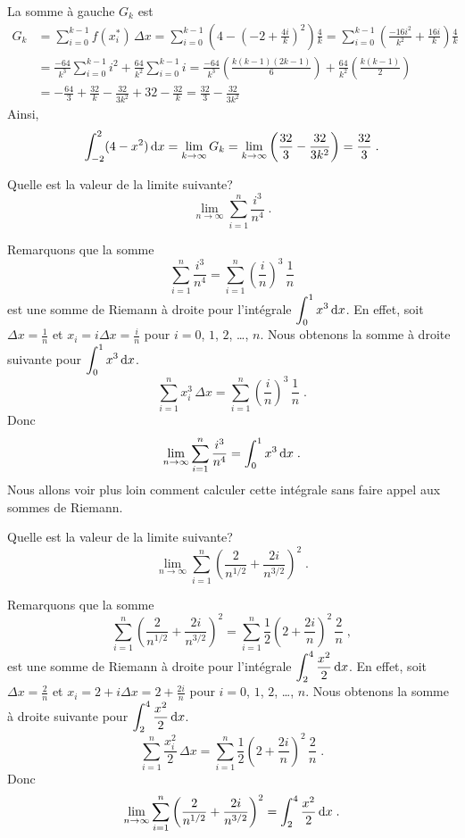 {\begin{egg}
La somme à gauche $G_k$ est
\begin{align*}
G_k &= \sum_{i=0}^{k-1} f(x_i^\ast) \, \Delta x 
= \sum_{i=0}^{k-1} \left(4-\left(-2+\frac{4i}{k}\right)^2\right) \frac{4}{k}
= \sum_{i=0}^{k-1} \left(\frac{-16i^2}{k^2}  + \frac{16i}{k}\right)
\frac{4}{k} \\
&= \frac{-64}{k^3} \sum_{i=0}^{k-1} i^2 + \frac{64}{k^2} \sum_{i=0}^{k-1} i
= \frac{-64}{k^3} \left(\frac{k(k-1)(2k-1)}{6} \right)
+ \frac{64}{k^2} \left(\frac{k(k-1)}{2} \right) \\
&= -\frac{64}{3} + \frac{32}{k} - \frac{32}{3k^2}
+ 32 - \frac{32}{k}  = \frac{32}{3} - \frac{32}{3k^2}
\end{align*}
Ainsi,
\[
\int_{-2}^2 (4-x^2)\,\mathrm{d}x = \lim_{k\rightarrow \infty} G_k
= \lim_{k\rightarrow \infty}
\left(\frac{32}{3} - \frac{32}{3k^2}\right) =
\frac{32}{3} \; .
\]
\end{egg}

\begin{egg}
Quelle est la valeur de la limite suivante?
\[
\lim_{n\rightarrow \infty} \sum_{i=1}^n \frac{i^3}{n^4} \; .
\]

Remarquons que la somme
\[
\sum_{i=1}^n \frac{i^3}{n^4} = \sum_{i=1}^n \left(\frac{i}{n}\right)^3
\, \frac{1}{n}
\]
est une somme de Riemann à droite pour l'intégrale
$\displaystyle \int_0^1 x^3 \,\mathrm{d}x$.
En effet, soit $\displaystyle \Delta x = \frac{1}{n}$ et
$\displaystyle x_i = i \Delta x = \frac{i}{n}$ pour $i=0$, $1$, $2$,
\ldots, $n$.  Nous obtenons la somme à droite suivante pour
$\displaystyle \int_0^1 x^3 \,\mathrm{d}x$.
\[
\sum_{i=1}^n x_i^3 \, \Delta x
= \sum_{i=1}^n \left(\frac{i}{n}\right)^3 \, \frac{1}{n} \; .
\]
Donc
\[
\lim_{n\rightarrow \infty} \sum_{i=1}^n \frac{i^3}{n^4}
= \int_0^1 x^3 \,\mathrm{d}x \; .
\]
Nous allons voir plus loin comment calculer cette intégrale sans faire
appel aux sommes de Riemann.
\end{egg}

\begin{egg}
Quelle est la valeur de la limite suivante?
\[
\lim_{n\rightarrow \infty} \sum_{i=1}^n \left( \frac{2}{n^{1/2}}
+ \frac{2i}{n^{3/2}}\right)^2 \; .
\]

Remarquons que la somme
\[
\sum_{i=1}^n \left( \frac{2}{n^{1/2}} + \frac{2i}{n^{3/2}}\right)^2
= \sum_{i=1}^n \frac{1}{2} \left( 2 + \frac{2i}{n}\right)^2 \, \frac{2}{n} \;,
\]
est une somme de Riemann à droite pour l'intégrale
$\displaystyle \int_2^4 \frac{x^2}{2} \,\mathrm{d}x$.
En effet, soit $\displaystyle \Delta x = \frac{2}{n}$ et
$\displaystyle x_i = 2 + i \Delta x = 2 + \frac{2i}{n}$ pour
$i=0$, $1$, $2$, \ldots, $n$.  Nous obtenons la somme à droite suivante
pour $\displaystyle \int_2^4 \frac{x^2}{2} \,\mathrm{d}x$.
\[
\sum_{i=1}^n \frac{x_i^2}{2} \, \Delta x
= \sum_{i=1}^n \frac{1}{2} \left( 2 + \frac{2i}{n}\right)^2 \, \frac{2}{n}
 \; .
\]
Donc
\[
\lim_{n\rightarrow \infty} \sum_{i=1}^n \left( \frac{2}{n^{1/2}}
+ \frac{2i}{n^{3/2}}\right)^2 = \int_2^4 \frac{x^2}{2} \,\mathrm{d}x \; .
\]
\end{egg}

}
